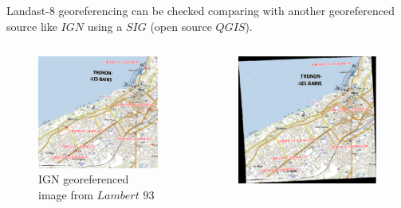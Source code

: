 \documentclass[c]{beamer}
\begin{document}
\begin{frame}
Landast-8 georeferencing can be checked comparing with another georeferenced source like $IGN$ using a $SIG$ (open source $QGIS$).\\
\begin{columns}
 \begin{column}{3cm}
    \begin{figure}
        \includegraphics[scale=0.13]{images/georeferencing/ign-points-Thonon.png}
        \caption{IGN georeferenced image from $Lambert$ $93$ }
    \end{figure}
  \end{column}
 \begin{column}{2cm}
    \begin{figure}
        \includegraphics[scale=0.09]{images/georeferencing/qgis-resultat.png}

\end{figure}
\end{column}
\end{columns}
\end{frame}
\end{document}

